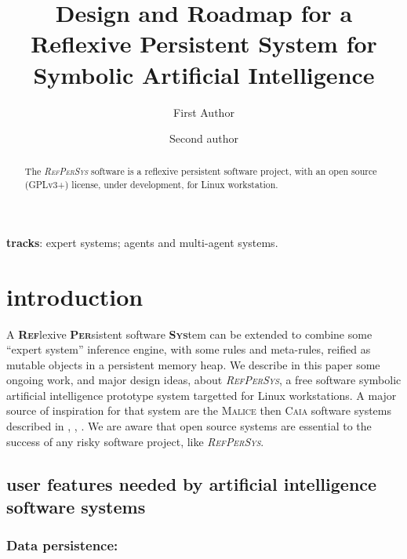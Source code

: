 \documentclass{svproc}
\begin{document}


\newcommand{\RefPerSys}[0]{{\textit{\textsc{RefPerSys}}}}

\mainmatter              %
%
\title{Design and Roadmap for a Reflexive Persistent System for
  Symbolic Artificial Intelligence} \titlerunning{\RefPerSys}
\author{First Author \and Second author} 


\maketitle

\begin{abstract}
  The \RefPerSys{} software is a reflexive persistent software
  project, with an open source (GPLv3+) license, under development,
  for Linux workstation.
\end{abstract}

\textbf{tracks}: expert systems; agents and multi-agent systems.

\section{introduction}

A \textsc{\textbf{Ref}}lexive \textsc{\textbf{Per}}sistent software
\textsc{\textbf{Sys}}tem can be extended to combine some ``expert
system'' inference engine, with some rules and meta-rules, reified as
mutable objects in a persistent memory heap. We describe in this paper
some ongoing work, and major design ideas, about \RefPerSys, a free
software symbolic artificial intelligence prototype system targetted
for Linux workstations. A major source of inspiration for that system
are the \textsc{Malice} then \textsc{Caia} software systems described
in \cite{Pitrat:1996:FGCS}, \cite{Pitrat:2009:AST},
\cite{Pitrat:2009:ArtifBeings}. We are aware that open source systems
\cite{Weber:2004:SuccessOpenSource} are essential to the success of
any risky software project, like \RefPerSys.

\subsection{user features needed by artificial intelligence software systems}

\subsubsection{Data persistence:}
\end{document}
